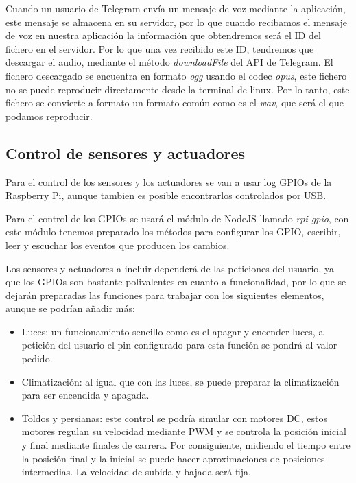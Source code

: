\documentclass[10pt,journal,compsoc]{IEEEtran}
\begin{document}
Cuando un usuario de Telegram envía un mensaje de voz mediante la aplicación, 
este mensaje se almacena en su servidor, por lo que cuando recibamos el mensaje 
de voz en nuestra aplicación la información que obtendremos será el ID del 
fichero en el servidor. Por lo que una vez recibido este ID, tendremos que 
descargar el audio, mediante el método \textit{downloadFile} del API de 
Telegram.
El fichero descargado se encuentra en formato \textit{ogg} usando el codec 
\textit{opus}, este fichero no se puede reproducir directamente desde la 
terminal de linux. Por lo tanto, este fichero se convierte a formato un formato común como es 
el \textit{wav}, que será el que podamos reproducir.

\subsection{Control de sensores y actuadores}
Para el control de los sensores y los actuadores se van a usar log GPIOs de la 
Raspberry Pi, aunque tambien es posible encontrarlos controlados por USB.

Para el control de los GPIOs se usará el módulo de NodeJS llamado 
\textit{rpi-gpio}, con este módulo tenemos preparado los métodos para configurar 
los GPIO, escribir, leer y escuchar los eventos que producen los cambios.

Los sensores y actuadores a incluir dependerá de las peticiones del usuario, ya 
que los GPIOs son bastante polivalentes en cuanto a funcionalidad, por lo que se 
dejarán preparadas las funciones para trabajar con los siguientes elementos, 
aunque se podrían añadir más:

\begin{itemize}
  \item Luces: un funcionamiento sencillo como es el apagar y encender luces, a 
  petición del usuario el pin configurado para esta función se pondrá al valor 
  pedido.
  \item Climatización: al igual que con las luces, se puede preparar la 
  climatización para ser encendida y apagada.
  \item Toldos y persianas: este control se podría simular con motores DC, estos 
  motores regulan su velocidad mediante PWM y se controla la posición inicial y 
  final mediante finales de carrera. 
  Por consiguiente, midiendo el tiempo entre la 
  posición final y la inicial se puede hacer aproximaciones de posiciones 
  intermedias. La velocidad de subida y bajada será fija.
\end{itemize}
\end{document}
